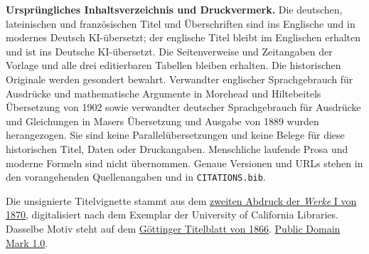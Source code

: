 \medskip
\textbf{Ursprüngliches Inhaltsverzeichnis und Druckvermerk.} Die deutschen, lateinischen und französischen Titel und Überschriften sind ins Englische und in modernes Deutsch KI-übersetzt; der englische Titel bleibt im Englischen erhalten und ist ins Deutsche KI-übersetzt. Die Seitenverweise und Zeitangaben der Vorlage und alle drei editierbaren Tabellen bleiben erhalten. Die historischen Originale werden gesondert bewahrt. Verwandter englischer Sprachgebrauch für Ausdrücke und mathematische Argumente in Morehead und Hiltebeitels Übersetzung von 1902 sowie verwandter deutscher Sprachgebrauch für Ausdrücke und Gleichungen in Masers Übersetzung und Ausgabe von 1889 wurden herangezogen. Sie sind keine Parallelübersetzungen und keine Belege für diese historischen Titel, Daten oder Druckangaben. Menschliche laufende Prosa und moderne Formeln sind nicht übernommen. Genaue Versionen und URLs stehen in den vorangehenden Quellenangaben und in \texttt{CITATIONS.bib}.
\par\medskip\noindent Die unsignierte Titelvignette stammt aus dem \href{https://commons.wikimedia.org/w/index.php?oldid=1179960952}{zweiten Abdruck der \textit{Werke} I von 1870}, digitalisiert nach dem Exemplar der University of California Libraries. Dasselbe Motiv steht auf dem \href{https://gdz.sub.uni-goettingen.de/id/PPN235999628}{Göttinger Titelblatt von 1866}. \href{https://creativecommons.org/publicdomain/mark/1.0/}{Public Domain Mark 1.0}.
\par\endgroup\clearpage
